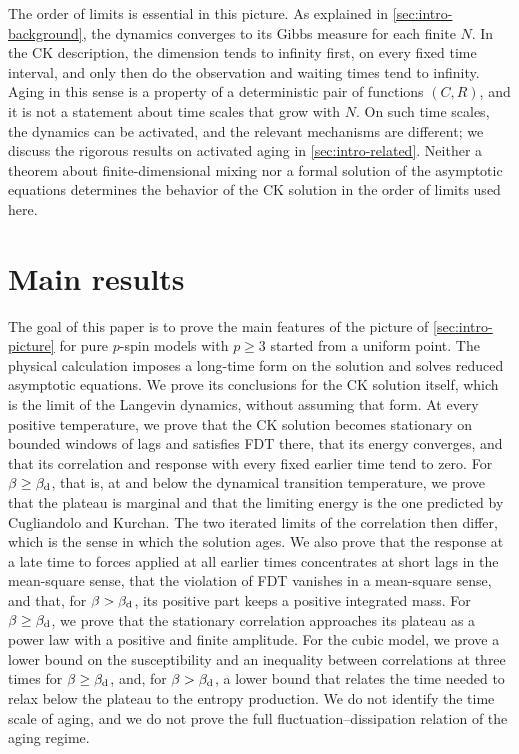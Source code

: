 The order of limits is essential in this picture. As explained in \cref{sec:intro-background}, the dynamics converges to its Gibbs measure for each finite $N$. In the CK description, the dimension tends to infinity first, on every fixed time interval, and only then do the observation and waiting times tend to infinity. Aging in this sense is a property of a deterministic pair of functions $(C,R)$, and it is not a statement about time scales that grow with $N$. On such time scales, the dynamics can be activated, and the relevant mechanisms are different; we discuss the rigorous results on activated aging in \cref{sec:intro-related}. Neither a theorem about finite-dimensional mixing nor a formal solution of the asymptotic equations determines the behavior of the CK solution in the order of limits used here.

\section{Main results}\label{sec:main-results}

The goal of this paper is to prove the main features of the picture of \cref{sec:intro-picture} for pure $p$-spin models with $p\ge3$ started from a uniform point. The physical calculation imposes a long-time form on the solution and solves reduced asymptotic equations. We prove its conclusions for the CK solution itself, which is the limit of the Langevin dynamics, without assuming that form. At every positive temperature, we prove that the CK solution becomes stationary on bounded windows of lags and satisfies FDT there, that its energy converges, and that its correlation and response with every fixed earlier time tend to zero. For $\beta\ge\beta_{\mathrm d}$, that is, at and below the dynamical transition temperature, we prove that the plateau is marginal and that the limiting energy is the one predicted by Cugliandolo and Kurchan. The two iterated limits of the correlation then differ, which is the sense in which the solution ages. We also prove that the response at a late time to forces applied at all earlier times concentrates at short lags in the mean-square sense, that the violation of FDT vanishes in a mean-square sense, and that, for $\beta>\beta_{\mathrm d}$, its positive part keeps a positive integrated mass. For $\beta\ge\beta_{\mathrm d}$, we prove that the stationary correlation approaches its plateau as a power law with a positive and finite amplitude. For the cubic model, we prove a lower bound on the susceptibility and an inequality between correlations at three times for $\beta\ge\beta_{\mathrm d}$, and, for $\beta>\beta_{\mathrm d}$, a lower bound that relates the time needed to relax below the plateau to the entropy production. We do not identify the time scale of aging, and we do not prove the full fluctuation--dissipation relation of the aging regime.

